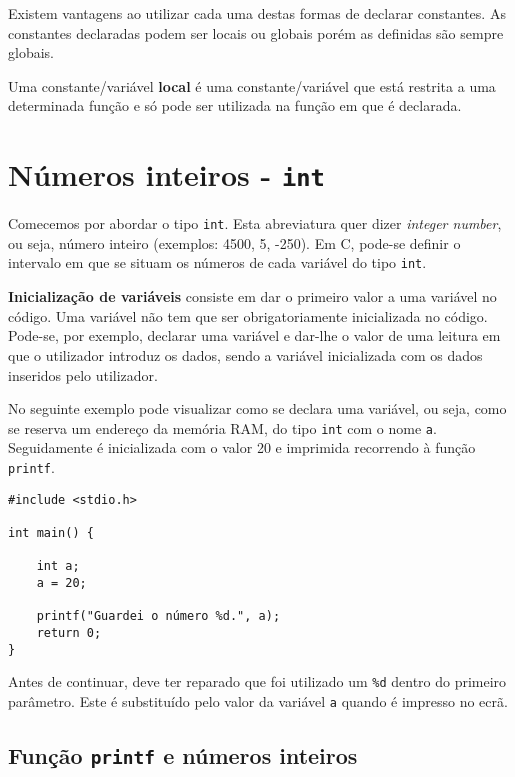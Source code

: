 Existem vantagens ao utilizar cada uma destas formas de declarar constantes. As constantes declaradas podem ser locais ou globais porém as definidas são sempre globais.

\begin{defi}
Uma constante/variável \textbf{local} é uma constante/variável que está restrita a uma determinada função e só pode ser utilizada na função em que é declarada.
\end{defi}

\section{Números inteiros - \texttt{int}}

Comecemos por abordar o tipo \texttt{int}. Esta abreviatura quer dizer \textit{integer number}, ou seja, número inteiro (exemplos: 4500, 5, -250). Em C, pode-se definir o intervalo em que se situam os números de cada variável do tipo \texttt{int}.

\begin{defi}
\textbf{Inicialização de variáveis} consiste em dar o primeiro valor a uma variável no código. Uma variável não tem que ser obrigatoriamente inicializada no código. Pode-se, por exemplo, declarar uma variável e dar-lhe o valor de uma leitura em que o utilizador introduz os dados, sendo a variável inicializada com os dados inseridos pelo utilizador.
\end{defi}

No seguinte exemplo pode visualizar como se declara uma variável, ou seja, como se reserva um endereço da memória RAM, do tipo \texttt{int} com o nome \texttt{a}. Seguidamente é inicializada com o valor 20 e imprimida recorrendo à função \texttt{printf}.

\begin{lstlisting}
#include <stdio.h>      

int main() {      
       
    int a;
    a = 20;      
           
    printf("Guardei o número %d.", a);  
    return 0;      
}      
\end{lstlisting}

Antes de continuar, deve ter reparado que foi utilizado um \texttt{\%d} dentro do primeiro parâmetro. Este  é substituído pelo valor da variável \texttt{a} quando é impresso no ecrã.

\subsection{Função \texttt{printf} e números inteiros}


